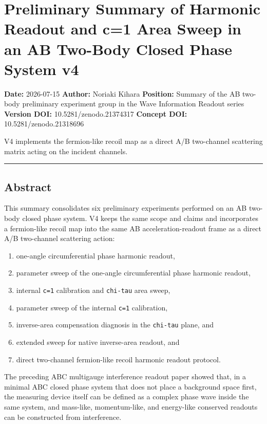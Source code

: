 \documentclass[
]{article}
\author{}
\date{}
\providecommand{\tightlist}{%
  \setlength{\itemsep}{0pt}\setlength{\parskip}{0pt}}
\begin{document}
\section{Preliminary Summary of Harmonic Readout and c=1 Area Sweep in
an AB Two-Body Closed Phase System
v4}\label{preliminary-summary-of-harmonic-readout-and-c1-area-sweep-in-an-ab-two-body-closed-phase-system-v4}

\textbf{Date:} 2026-07-15 \textbf{Author:} Noriaki Kihara
\textbf{Position:} Summary of the AB two-body preliminary experiment
group in the Wave Information Readout series \textbf{Version DOI:}
10.5281/zenodo.21374317 \textbf{Concept DOI:} 10.5281/zenodo.21318696

V4 implements the fermion-like recoil map as a direct A/B two-channel
scattering matrix acting on the incident channels.

\begin{center}\rule{0.5\linewidth}{0.5pt}\end{center}

\subsection{Abstract}\label{abstract}

This summary consolidates six preliminary experiments performed on an AB
two-body closed phase system. V4 keeps the same scope and claims and
incorporates a fermion-like recoil map into the same AB
acceleration-readout frame as a direct A/B two-channel scattering
action:

\begin{enumerate}
\def\labelenumi{\arabic{enumi}.}
\tightlist
\item
  one-angle circumferential phase harmonic readout,
\item
  parameter sweep of the one-angle circumferential phase harmonic
  readout,
\item
  internal \texttt{c=1} calibration and \texttt{chi-tau} area sweep,
\item
  parameter sweep of the internal \texttt{c=1} calibration,
\item
  inverse-area compensation diagnosis in the \texttt{chi-tau} plane, and
\item
  extended sweep for native inverse-area readout, and
\item
  direct two-channel fermion-like recoil harmonic readout protocol.
\end{enumerate}

The preceding ABC multigauge interference readout paper showed that, in
a minimal ABC closed phase system that does not place a background space
first, the measuring device itself can be defined as a complex phase
wave inside the same system, and mass-like, momentum-like, and
energy-like conserved readouts can be constructed from interference.
\end{document}
